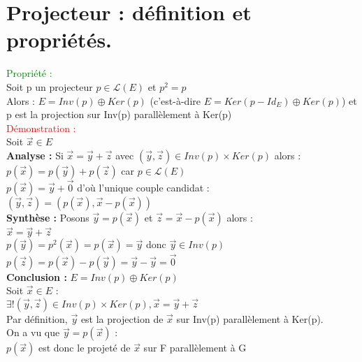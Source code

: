 \documentclass{article}
\begin{document}
\section{Projecteur : définition et propriétés.}
\textcolor{green}{Propriété :} \\ 
Soit p un projecteur $p \in \mathcal{L}(E)$ et $p^2=p$ \\ 
Alors : $E = Inv(p) \oplus Ker(p)$ (c'est-à-dire $E=Ker(p-Id_E) \oplus Ker(p)$) et p est la projection sur Inv(p) parallèlement à Ker(p) \\ 
\textcolor{red}{Démonstration :} \\ 
Soit $\vec{x} \in E$ \\ 
{\bf Analyse :} Si $\vec{x}=\vec{y}+ \vec{z}$ avec $(\vec{y},\vec{z}) \in Inv(p) \times Ker(p)$ alors : \\ 
$p(\vec{x})=p(\vec{y})+p(\vec{z})$ car $p\in \mathcal{L}(E)$ \\ 
$p(\vec{x})=\vec{y}+ \vec{0}$ d'où l'unique couple candidat : \\ 
$(\vec{y},\vec{z})=(p(\vec{x}),\vec{x}-p(\vec{x}))$ \\ 
{\bf Synthèse :} Posons $\vec{y}= p(\vec{x})$ et $\vec{z}= \vec{x}- p(\vec{x})$ alors : \\ 
$\vec{x}=\vec{y}+\vec{z}$ \\ 
$p(\vec{y})=p^2(\vec{x})=p(\vec{x})=\vec{y}$ donc $\vec{y} \in Inv(p)$ \\ 
$p(\vec{z})=p(\vec{x})-p(\vec{y})=\vec{y}-\vec{y}=\vec{0}$ \\ 
{\bf Conclusion :} $E=Inv(p) \oplus Ker(p)$ \\ 
Soit $\vec{x} \in E$ : \\ 
$\exists !(\vec{y},\vec{z}) \in Inv(p) \times Ker(p), \vec{x}= \vec{y} + \vec{z}$ \\ 
Par définition, $\vec{y}$ est la projection de $\vec{x}$ sur Inv(p) parallèlement à Ker(p). \\ 
On a vu que $\vec{y}=p(\vec{x})$ : \\ 
$p(\vec{x})$ est donc le projeté de $\vec{x}$ sur F parallèlement à G
\end{document}
